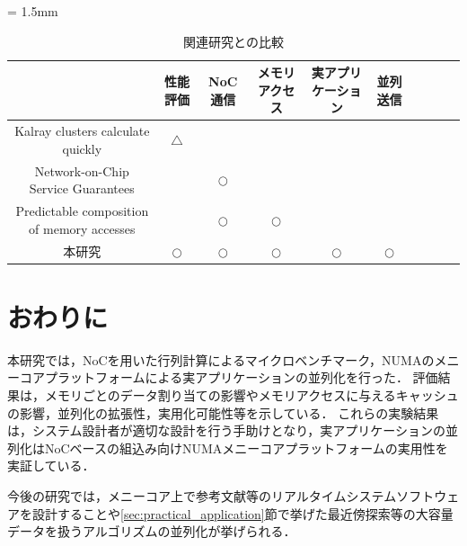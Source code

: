 \documentclass[submit,techrep]{ipsj_v2/UTF8/ipsj}
\begin{document}
\begin{table}[t]
  \caption{\label{tb:comparison_relatedwork}
    関連研究との比較}
  \centering
  \scriptsize	                    %
  \tabcolsep = 1.5mm              %
  \begin{tabular}{c|ccccccccc}
    \hline
    & 性能評価 & NoC通信 & メモリアクセス & 実アプリケーション & 並列送信 & \\
    \hline
    \hline
    Kalray clusters calculate quickly \cite{kanter2015kalray} & \(\triangle\) &  &  &  &  & \\
    Network-on-Chip Service Guarantees \cite{denet2017work} &  & \(\bigcirc\) &  &  &  & \\
    Predictable composition of memory accesses \cite{perret2016predictable} &  & \(\bigcirc\) & \(\bigcirc\) &  &  & \\
    本研究 & \(\bigcirc\) & \(\bigcirc\) & \(\bigcirc\) & \(\bigcirc\) & \(\bigcirc\) & \\
    \hline
  \end{tabular}
\end{table}

\section{おわりに}
\label{sec:conclusion}
本研究では，NoCを用いた行列計算によるマイクロベンチマーク，NUMAのメニーコアプラットフォームによる実アプリケーションの並列化を行った．
評価結果は，メモリごとのデータ割り当ての影響やメモリアクセスに与えるキャッシュの影響，並列化の拡張性，実用化可能性等を示している．
これらの実験結果は，システム設計者が適切な設計を行う手助けとなり，実アプリケーションの並列化はNoCベースの組込み向けNUMAメニーコアプラットフォームの実用性を実証している．

今後の研究では，メニーコア上で参考文献\cite{maruyama2016ros2}等のリアルタイムシステムソフトウェアを設計することや\ref{sec:practical_application}節で挙げた最近傍探索等の大容量データを扱うアルゴリズムの並列化が挙げられる．



\end{document}
